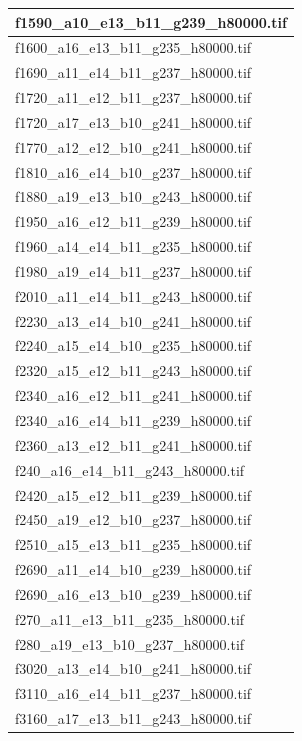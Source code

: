 \documentclass[12pt, twoside]{article}
\begin{document}
\begin{appendices}
\begin{longtable}{|l|}
		f1590\_a10\_e13\_b11\_g239\_h80000.tif \\ \hline 
		f1600\_a16\_e13\_b11\_g235\_h80000.tif \\ \hline 
		f1690\_a11\_e14\_b11\_g237\_h80000.tif \\ \hline 
		f1720\_a11\_e12\_b11\_g237\_h80000.tif \\ \hline 
		f1720\_a17\_e13\_b10\_g241\_h80000.tif \\ \hline 
		f1770\_a12\_e12\_b10\_g241\_h80000.tif \\ \hline 
		f1810\_a16\_e14\_b10\_g237\_h80000.tif \\ \hline 
		f1880\_a19\_e13\_b10\_g243\_h80000.tif \\ \hline 
		f1950\_a16\_e12\_b11\_g239\_h80000.tif \\ \hline 
		f1960\_a14\_e14\_b11\_g235\_h80000.tif \\ \hline 
		f1980\_a19\_e14\_b11\_g237\_h80000.tif \\ \hline 
		f2010\_a11\_e14\_b11\_g243\_h80000.tif \\ \hline 
		f2230\_a13\_e14\_b10\_g241\_h80000.tif \\ \hline 
		f2240\_a15\_e14\_b10\_g235\_h80000.tif \\ \hline 
		f2320\_a15\_e12\_b11\_g243\_h80000.tif \\ \hline 
		f2340\_a16\_e12\_b11\_g241\_h80000.tif \\ \hline 
		f2340\_a16\_e14\_b11\_g239\_h80000.tif \\ \hline 
		f2360\_a13\_e12\_b11\_g241\_h80000.tif \\ \hline 
		f240\_a16\_e14\_b11\_g243\_h80000.tif \\ \hline 
		f2420\_a15\_e12\_b11\_g239\_h80000.tif \\ \hline 
		f2450\_a19\_e12\_b10\_g237\_h80000.tif \\ \hline 
		f2510\_a15\_e13\_b11\_g235\_h80000.tif \\ \hline 
		f2690\_a11\_e14\_b10\_g239\_h80000.tif \\ \hline 
		f2690\_a16\_e13\_b10\_g239\_h80000.tif \\ \hline 
		f270\_a11\_e13\_b11\_g235\_h80000.tif \\ \hline 
		f280\_a19\_e13\_b10\_g237\_h80000.tif \\ \hline 
		f3020\_a13\_e14\_b10\_g241\_h80000.tif \\ \hline 
		f3110\_a16\_e14\_b11\_g237\_h80000.tif \\ \hline 
		f3160\_a17\_e13\_b11\_g243\_h80000.tif \\ \hline 

\end{longtable}
\end{appendices}
\end{document}
